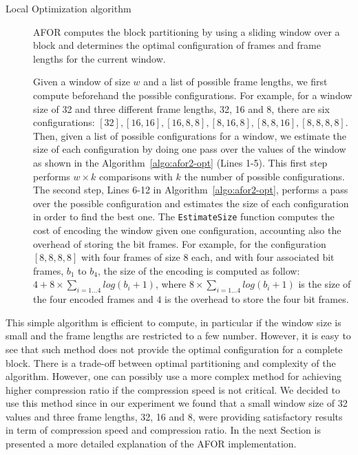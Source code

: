 \begin{description}
\item[Local Optimization algorithm]
AFOR computes the block partitioning by using a sliding window over a block
and determines the optimal configuration of frames and frame lengths for the
current window.

Given a window of size $w$ and a list of possible frame
lengths, we first compute beforehand the possible configurations. For example,
for a window size of 32 and three different frame lengths, 32, 16 and 8, there
are six configurations: $[32],[16,16],[16,8,8],[8,16,8],[8,8,16],[8,8,8,8]$.
Then, given a list of possible configurations for a window, we
estimate the size of each configuration by doing one pass over the values of
the window as shown in the Algorithm~\ref{algo:afor2-opt} (Lines 1-5). This
first step performs $w \times k$ comparisons with $k$ the number of possible
configurations. The second step, Lines 6-12 in Algorithm~\ref{algo:afor2-opt},
performs a pass over the possible configuration and estimates the size of each
configuration in order to find the best one. The \texttt{EstimateSize}
function computes the cost of encoding the window given one configuration,
accounting also the overhead of storing the bit frames. For example, for the
configuration $[8,8,8,8]$ with four frames of size 8 each, and with four
associated bit frames, $b_{1}$ to $b_{4}$, the size of the encoding is
computed as follow: $4 + 8 \times \sum_{i=1\ldots4} log(b_i + 1)$, where $8
\times \sum_{i=1\ldots4} log(b_i + 1)$ is the size of the four encoded frames
and $4$ is the overhead to store the four bit frames.
\end{description}

This simple algorithm is efficient to compute, in particular if the
window size is small and the frame lengths are restricted to a few number.
However, it is easy to see that such method does not provide the optimal
configuration for a complete block. There is a trade-off between optimal
partitioning and complexity of the algorithm. However, one can possibly use a
more complex method for achieving higher compression ratio if the compression
speed is not critical. We decided to use this method since in our experiment
we found that a small window size of 32 values and three frame lengths, 32, 16
and 8, were providing satisfactory results in term of compression speed and
compression ratio. In the next Section is presented a more detailed explanation
of the AFOR implementation.

